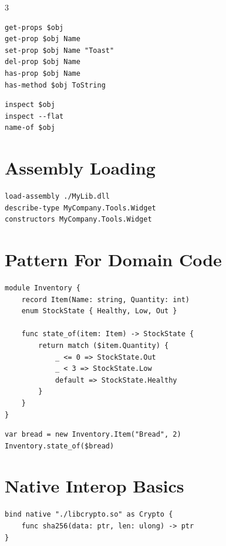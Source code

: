 \begin{multicols*}{3}
\begin{lstlisting}
get-props $obj
get-prop $obj Name
set-prop $obj Name "Toast"
del-prop $obj Name
has-prop $obj Name
has-method $obj ToString
\end{lstlisting}

\begin{lstlisting}
inspect $obj
inspect --flat
name-of $obj
\end{lstlisting}


\section{Assembly Loading}
\begin{lstlisting}
load-assembly ./MyLib.dll
describe-type MyCompany.Tools.Widget
constructors MyCompany.Tools.Widget
\end{lstlisting}


\columnbreak

\section{Pattern For Domain Code}
\begin{lstlisting}
module Inventory {
    record Item(Name: string, Quantity: int)
    enum StockState { Healthy, Low, Out }

    func state_of(item: Item) -> StockState {
        return match ($item.Quantity) {
            _ <= 0 => StockState.Out
            _ < 3 => StockState.Low
            default => StockState.Healthy
        }
    }
}
\end{lstlisting}

\begin{lstlisting}
var bread = new Inventory.Item("Bread", 2)
Inventory.state_of($bread)
\end{lstlisting}

\section{Native Interop Basics}
\begin{lstlisting}
bind native "./libcrypto.so" as Crypto {
    func sha256(data: ptr, len: ulong) -> ptr
}
\end{lstlisting}


\end{multicols*}
